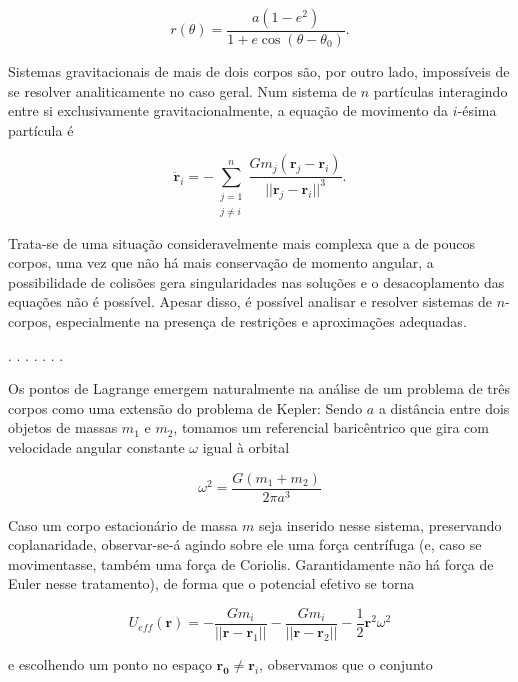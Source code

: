 \begin{equation}
    r(\theta) = \frac{a(1 - e^2)}{1 + e\cos (\theta - \theta_0)}.
\end{equation}

Sistemas gravitacionais de mais de dois corpos são, por outro lado, impossíveis de se resolver analiticamente no caso geral. Num sistema de $n$ partículas interagindo entre si exclusivamente gravitacionalmente, a equação de movimento da $i$-ésima partícula é 

\begin{equation}
    \ddot{\mathbf{r}}_i=-\sum_{\substack{j=1\\j \neq i}}^{n} \frac{Gm_j(\mathbf{r}_j - \mathbf{r}_i)}{||\mathbf{r}_j - \mathbf{r}_i||^3}.
\end{equation} 

Trata-se de uma situação consideravelmente mais complexa que a de poucos corpos, uma vez que não há mais conservação de momento angular, a possibilidade de colisões gera singularidades nas soluções e o desacoplamento das equações não é possível. Apesar disso, é possível analisar e resolver sistemas de $n$-corpos, especialmente na presença de restrições e aproximações adequadas.

.		.		.		.		.		.		.	

Os pontos de Lagrange emergem naturalmente na análise de um problema de três corpos como uma extensão do problema de Kepler: Sendo $a$ a distância entre dois objetos de massas $m_1$ e $m_2$, tomamos um referencial baricêntrico que gira com velocidade angular constante $\omega$ igual à orbital

\begin{equation}
    \omega^2 = \frac{G(m_1 + m_2)}{2\pi a^3}
\end{equation}

Caso um corpo estacionário de massa $m$ seja inserido nesse sistema, preservando coplanaridade, observar-se-á agindo sobre ele uma força centrífuga (e, caso se movimentasse, também uma força de Coriolis. Garantidamente não há força de Euler nesse tratamento), de forma que o potencial efetivo se torna

\begin{equation}
    U_{eff}(\mathbf{r}) = - \frac{Gm_i}{||\mathbf{r} - \mathbf{r}_1||} - \frac{Gm_i}{||\mathbf{r} - \mathbf{r}_2||} - \frac{1}{2}\mathbf{r}^2\omega^2
\end{equation}

e escolhendo um ponto no espaço $\mathbf{r_0} \neq \mathbf{r}_i$, observamos que o conjunto


